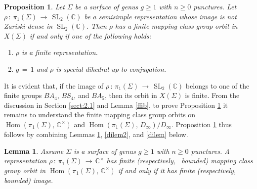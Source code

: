 \documentclass[reqno]{amsart}
\theoremstyle{plain}
\newtheorem{lemma}[theorem]{Lemma}
\newtheorem{proposition}[theorem]{Proposition}
\theoremstyle{definition}
\theoremstyle{remark}
\newcommand{\C}{{\mathbb{C}}}
\DeclareMathOperator{\Hom}{Hom}
\DeclareMathOperator{\SL}{SL}
\begin{document}
\begin{proposition}\label{g1prop}
Let $\Sigma$ be a surface of genus $g\geq1$ with $n\geq0$ punctures. Let $\rho\,:\,\pi_1(\Sigma)\,\to\,\SL_2(\C)$
be a semisimple representation whose image is not Zariski-dense in $\SL_2(\C)$. Then $\rho$ has a finite
mapping class group orbit in $X(\Sigma)$ if and only if one of the following
holds:
\begin{enumerate}
\item[\textup{(1)}] $\rho$ is a finite representation.
\item[\textup{(2)}] $g\,=\,1$ and $\rho$ is special dihedral up to conjugation.
\end{enumerate}
\end{proposition}

It is evident that, if the image of $\rho\,:\,\pi_1(\Sigma)\,\to\,\SL_2(\C)$ belongs to one of the finite 
groups $BA_4$, $BS_4$, and $BA_5$, then its orbit in $X(\Sigma)$ is finite. From the discussion in Section 
\ref{sect:2.1} and Lemma \ref{ffib}, to prove Proposition \ref{g1prop} it remains to understand the finite 
mapping class group orbits on $\Hom(\pi_1(\Sigma),\,\C^\times)$ and $\Hom(\pi_1(\Sigma),\,D_\infty)/D_\infty$. 
Proposition \ref{g1prop} thus follows by combining Lemmas \ref{redlemm}, \ref{dilem2}, and \ref{dilem} below.\\


\begin{lemma}\label{redlemm}
Assume $\Sigma$ is a surface of genus $g\geq1$ with $n\geq0$ punctures. A representation $\rho\,:\,
\pi_1(\Sigma)\,\to\,\C^\times$ has finite (respectively, ~bounded) mapping class group orbit in $\Hom(\pi_1(\Sigma),
\,\C^\times)$ if and only if it has finite (respectively, bounded) image.
\end{lemma}
\end{document}
